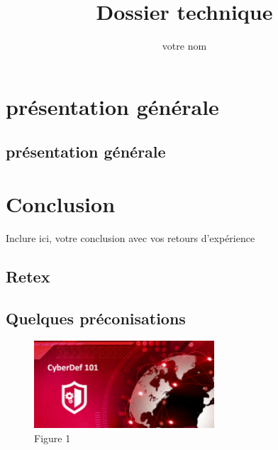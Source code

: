 \documentclass[11pt,fleqn,twoside]{article}
\author{votre nom}
\title{Dossier technique}
\begin{document}
\maketitle
\uelogo


\section{présentation générale}
\subsection{présentation générale}
\section{Conclusion}
Inclure ici, votre conclusion avec vos retours d'expérience
\subsection{Retex}
\subsection{Quelques préconisations}


\begin{figure}[h!]
\begin{center}
	\includegraphics[width =0.6\textwidth, keepaspectratio]{images/image-test}
	\caption{Figure 1}\label{mon image}
	\end{center}
\end{figure}
\end{document}
